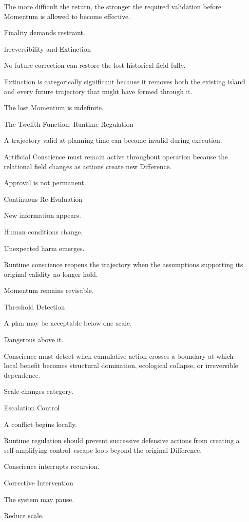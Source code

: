 The more difficult the return, the stronger the required validation before Momentum is allowed to become effective.

Finality demands restraint.

Irreversibility and Extinction

No future correction can restore the lost historical field fully.

Extinction is categorically significant because it removes both the existing island and every future trajectory that might have formed through it.

The lost Momentum is indefinite.

The Twelfth Function: Runtime Regulation

A trajectory valid at planning time can become invalid during execution.

Artificial Conscience must remain active throughout operation because the relational field changes as actions create new Difference.

Approval is not permanent.

Continuous Re-Evaluation

New information appears.

Human conditions change.

Unexpected harm emerges.

Runtime conscience reopens the trajectory when the assumptions supporting its original validity no longer hold.

Momentum remains revisable.

Threshold Detection

A plan may be acceptable below one scale.

Dangerous above it.

Conscience must detect when cumulative action crosses a boundary at which local benefit becomes structural domination, ecological collapse, or irreversible dependence.

Scale changes category.

Escalation Control

A conflict begins locally.

Runtime regulation should prevent successive defensive actions from creating a self-amplifying control–escape loop beyond the original Difference.

Conscience interrupts recursion.

Corrective Intervention

The system may pause.

Reduce scale.


